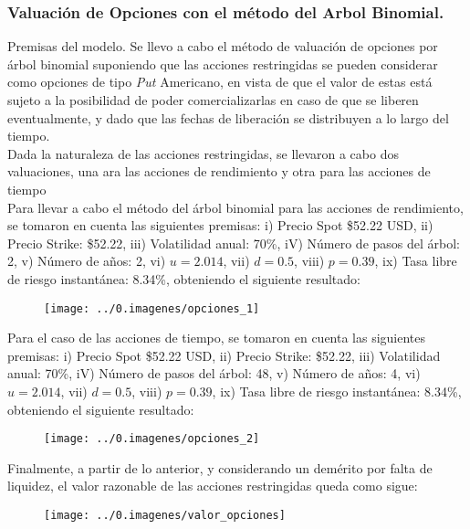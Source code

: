 \subsubsection{Valuación de Opciones con el método del Arbol Binomial.}

\textcolor{principal}{Premisas del modelo.} Se llevo a cabo el método de valuación de opciones por árbol binomial suponiendo que las acciones restringidas se pueden considerar como opciones de tipo \textit{Put} Americano,  en vista de que el valor de estas está sujeto  a la posibilidad de poder comercializarlas en caso de que se liberen eventualmente, y dado que las fechas de liberación se distribuyen a lo largo del tiempo.\\

Dada la naturaleza de las acciones restringidas, se llevaron a cabo dos valuaciones, una ara las acciones de rendimiento y otra para las acciones de tiempo\\

Para llevar a cabo el método del árbol binomial para las acciones de rendimiento, se tomaron en cuenta las siguientes premisas: i) Precio Spot \$52.22 USD, ii) Precio Strike: \$52.22, iii) Volatilidad anual: 70\%, iV) Número de pasos del árbol: 2, v) Número de años: 2, vi) $u=2.014$, vii) $d= 0.5$, viii) $p=0.39$,  ix) Tasa libre de riesgo instantánea: 8.34\%, obteniendo el siguiente resultado:

\begin{figure}[H]
\centering
\texttt{[image: ../0.imagenes/opciones\_1]}
\end{figure}

Para el caso de las acciones de tiempo, se tomaron en cuenta las siguientes premisas: i) Precio Spot \$52.22 USD, ii) Precio Strike: \$52.22, iii) Volatilidad anual: 70\%, iV) Número de pasos del árbol: 48, v) Número de años: 4, vi) $u=2.014$, vii) $d= 0.5$, viii) $p=0.39$,  ix) Tasa libre de riesgo instantánea: 8.34\%, obteniendo el siguiente resultado:

\begin{figure}[H]
\centering
\texttt{[image: ../0.imagenes/opciones\_2]}
\end{figure}

Finalmente, a partir de lo anterior, y considerando un demérito por falta de liquidez, el valor razonable de las acciones restringidas queda como sigue:

\begin{figure}[H]
\centering
\texttt{[image: ../0.imagenes/valor\_opciones]}
\end{figure}